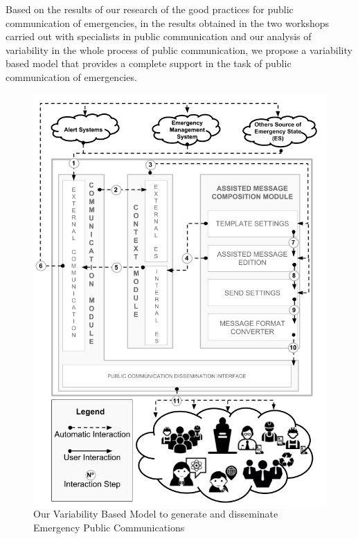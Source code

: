 \label{sec:variabilityModel}

Based on the results of our research of the good practices for public communication of emergencies, in the results obtained in the two workshops carried out with specialists in public communication and our analysis of variability in the whole process of public communication, we propose a variability based model that provides a complete support in the task of public communication of emergencies.   

\begin{figure}[ht!]
\begin{center}
  \includegraphics[width=\linewidth, keepaspectratio]{images/ConceptualModel.png}
\caption{Our Variability Based Model to generate and disseminate Emergency Public Communications}
\label{fig:ConceptualModel}
\end{center}
\end{figure}

